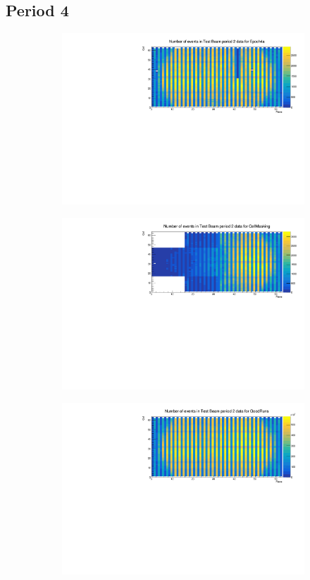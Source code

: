 \documentclass[12pt,a4paper]{article}
\begin{document}
\subsection{Period 4}\label{secTBPeriod4}

\begin{figure}[!hbtp]
\centering
\begin{subfigure}[b]{\textwidth}
\centering
\includegraphics[width=.9\textwidth]{Plots/Attenprofs_P4Data_CellPlane_Epoch4a.pdf}
\end{subfigure}
\begin{subfigure}[b]{\textwidth}
\centering
\includegraphics[width=.9\textwidth]{Plots/Attenprofs_P4Data_CellPlane_CellMasking.pdf}
\end{subfigure}
\begin{subfigure}[b]{\textwidth}
\centering
\includegraphics[width=.9\textwidth]{Plots/Attenprofs_P4Data_CellPlane_GoodRuns.pdf}

\end{subfigure}
\end{figure}
\end{document}
